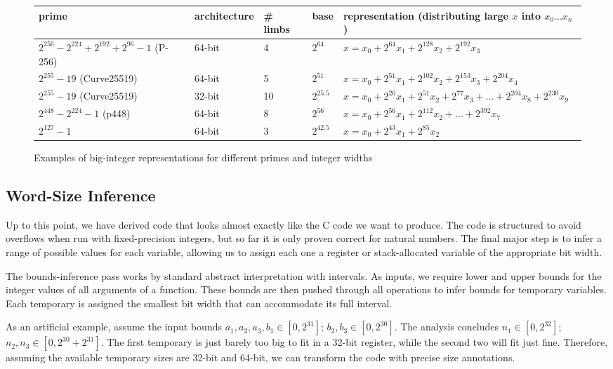 \documentclass[conference,letterpaper]{IEEEtran}
\begin{document}
\begin{figure*}
  \begin{tabular}{|p{4cm}|l|l|l|l|}
\hline
    prime & architecture & \# limbs & base & representation (distributing large $x$ into $x_0...x_n$)\\
\hline
    $2^{256} - 2^{224} + 2^{192} + 2^{96} - 1$ (P-256) & 64-bit & 4 & $2^{64}$ & $x = x_0 + 2^{64}x_1 + 2^{128}x_2 + 2^{192}x_3$ \\
\hline
  $2^{255}-19$ (Curve25519) & 64-bit & 5 & $2^{51}$ & $x = x_0 + 2^{51}x_1 + 2^{102}x_2 + 2^{153}x_3 + 2^{204}x_4$ \\
\hline
  $2^{255}-19$ (Curve25519) & 32-bit & 10 & $2^{25.5}$ & $x = x_0 + 2^{26}x_1 + 2^{51}x_2 + 2^{77}x_3 + ... + 2^{204}x_8 + 2^{230}x_9$ \\
\hline
  $2^{448} - 2^{224} - 1$ (p448) & 64-bit & 8 & $2^{56}$ & $x = x_0 + 2^{56}x_1 + 2^{112}x_2 + ... + 2^{392}x_7$ \\
\hline
    $2^{127} - 1$ & 64-bit & 3 & $2^{42.5}$ & $x = x_0 + 2^{43}x_1 + 2^{85}x_2$ \\
\hline
\end{tabular}
  \caption{\label{fig:representationexamples}Examples of big-integer representations for different primes and integer widths}
\end{figure*}

\subsection{Word-Size Inference}\label{ex-bounds}

Up to this point, we have derived code that looks almost exactly like the C code we want to produce.
The code is structured to avoid overflows when run with fixed-precision integers, but so far it is only proven correct for natural numbers.
The final major step is to infer a range of possible values for each variable, allowing us to assign each one a register or stack-allocated variable of the appropriate bit width.

The bounds-inference pass works by standard abstract interpretation with intervals.
As inputs, we require lower and upper bounds for the integer values of all arguments of a function.
These bounds are then pushed through all operations to infer bounds for temporary variables.
Each temporary is assigned the smallest bit width that can accommodate its full interval.

As an artificial example, assume the input bounds $a_1, a_2, a_3, b_1 \in [0, 2^{31}]$; $b_2, b_3 \in [0, 2^{30}]$.
The analysis concludes $n_1 \in [0, 2^{32}]$; $n_2, n_3 \in [0, 2^{30} + 2^{31}]$.
The first temporary is just barely too big to fit in a 32-bit register, while the second two will fit just fine.
Therefore, assuming the available temporary sizes are 32-bit and 64-bit, we can transform the code with precise size annotations.
\end{document}
